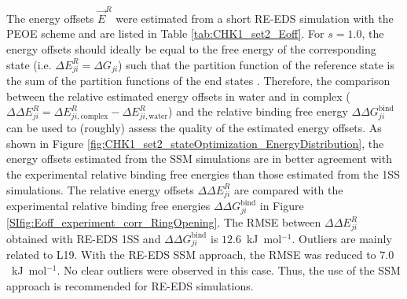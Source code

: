 The energy offsets $\vec{E}^R$ were estimated from a short RE-EDS simulation with the PEOE \cite{Sidler2016} scheme and are listed in Table \ref{tab:CHK1_set2_Eoff}.
For $s=1.0$, the energy offsets should ideally be equal to the free energy of the corresponding state (i.e. $\Delta E^R_{ji} = \Delta G_{ji}$) such that the partition function of the reference state is the sum of the partition functions of the end states \cite{Christ2008}. Therefore, the comparison between the relative estimated energy offsets in water and in complex ($\Delta \Delta E^R_{ji} = \Delta E^R_{ji,\text{complex}} - \Delta E^R_{ji,\text{water}}$) and the relative binding free energy $\Delta \Delta G^\text{bind}_{ji}$ can be used to (roughly) assess the quality of the estimated energy offsets. As shown in Figure \ref{fig:CHK1_set2_stateOptimization_EnergyDistribution},
the energy offsets estimated from the SSM simulations are in better agreement with the experimental relative binding free energies than those estimated from the 1SS simulations.
The relative energy offsets $\Delta \Delta E^R_{ji}$ are compared with the experimental relative binding free energies $\Delta \Delta G^\text{bind}_{ji}$ in Figure \ref{SIfig:Eoff_experiment_corr_RingOpening}. 
The RMSE between $\Delta \Delta E^R_{ji}$ obtained with RE-EDS 1SS and $\Delta \Delta G^\text{bind}_{ji}$ is $12.6$~kJ~mol$^{-1}$. Outliers are mainly related to L19.
With the RE-EDS SSM approach, the RMSE was reduced to $7.0$~kJ~mol$^{-1}$. No clear outliers were observed in this case. Thus, the use of the SSM approach is recommended for RE-EDS simulations.

